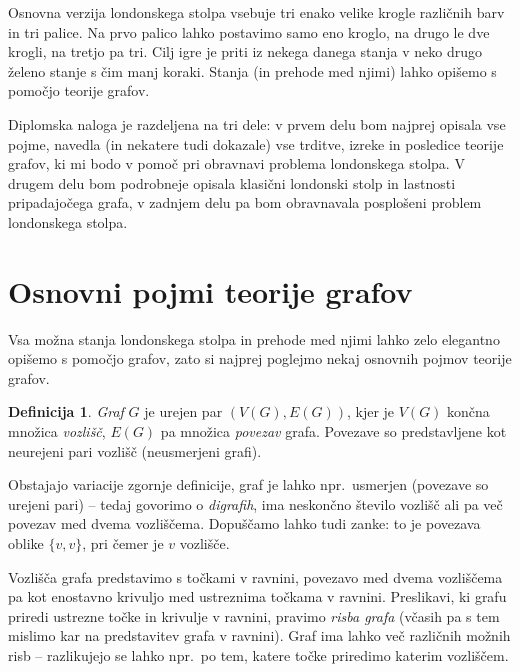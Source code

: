 \documentclass[12pt,a4paper]{amsart}
\theoremstyle{definition} %
\newtheorem{definicija}{Definicija}[section]
\theoremstyle{plain} %
\newcommand{\vozlisca}[1][G]{\ensuremath{V(#1)}}
\newcommand{\povezave}[1][G]{\ensuremath{E(#1)}}
\begin{document}
Osnovna verzija londonskega stolpa vsebuje tri enako velike krogle različnih barv in tri palice. Na prvo palico lahko postavimo samo eno kroglo, na drugo le dve krogli, na tretjo pa tri. Cilj igre je priti iz nekega danega stanja v neko drugo želeno stanje s čim manj koraki. Stanja (in prehode med njimi) lahko opišemo s pomočjo teorije grafov.

Diplomska naloga je razdeljena na tri dele: v prvem delu bom najprej opisala vse pojme, navedla (in nekatere tudi dokazale) vse trditve, izreke in posledice teorije grafov, ki mi bodo v pomoč pri obravnavi problema londonskega stolpa. V drugem delu bom podrobneje opisala klasični londonski stolp in lastnosti pripadajočega grafa, v zadnjem delu pa bom obravnavala posplošeni problem londonskega stolpa.


\section{Osnovni pojmi teorije grafov}

Vsa možna stanja londonskega stolpa in prehode med njimi lahko zelo elegantno opišemo s pomočjo grafov, zato si najprej poglejmo nekaj osnovnih pojmov teorije grafov.

\begin{definicija}
	\emph{Graf} $G$ je urejen par $(\vozlisca, \povezave)$, kjer je $\vozlisca$ končna množica \emph{vozlišč}, $\povezave$ pa množica \emph{povezav} grafa. Povezave so predstavljene kot neurejeni pari vozlišč (neusmerjeni grafi).
\end{definicija}

Obstajajo variacije zgornje definicije, graf je lahko npr.\ usmerjen (povezave so urejeni pari) -- tedaj govorimo o \emph{digrafih}, ima neskončno število vozlišč ali pa več povezav med dvema vozliščema. Dopuščamo lahko tudi zanke: to je povezava oblike $\{v,v\}$, pri čemer je $v$ vozlišče.

Vozlišča grafa predstavimo s točkami v ravnini, povezavo med dvema vozliščema pa kot enostavno krivuljo med ustreznima točkama v ravnini. Preslikavi, ki grafu priredi ustrezne točke in krivulje v ravnini, pravimo \emph{risba grafa} (včasih pa s tem mislimo kar na predstavitev grafa v ravnini). Graf ima lahko več različnih možnih risb -- razlikujejo se lahko npr.\ po tem, katere točke priredimo katerim vozliščem.
\end{document}
